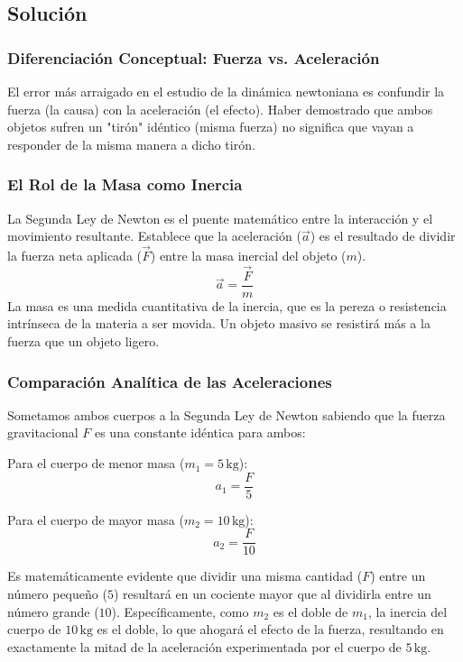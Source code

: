 \documentclass[12pt]{article}
\begin{document}
\subsection*{Solución}

\subsubsection*{Diferenciación Conceptual: Fuerza vs. Aceleración}
El error más arraigado en el estudio de la dinámica newtoniana es confundir la fuerza (la causa) con la aceleración (el efecto). Haber demostrado que ambos objetos sufren un "tirón" idéntico (misma fuerza) no significa que vayan a responder de la misma manera a dicho tirón. 

\subsubsection*{El Rol de la Masa como Inercia}
La Segunda Ley de Newton es el puente matemático entre la interacción y el movimiento resultante. Establece que la aceleración ($\vec{a}$) es el resultado de dividir la fuerza neta aplicada ($\vec{F}$) entre la masa inercial del objeto ($m$).
\begin{equation}
    \vec{a} = \frac{\vec{F}}{m}
\end{equation}
La masa es una medida cuantitativa de la inercia, que es la pereza o resistencia intrínseca de la materia a ser movida. Un objeto masivo se resistirá más a la fuerza que un objeto ligero.

\subsubsection*{Comparación Analítica de las Aceleraciones}
Sometamos ambos cuerpos a la Segunda Ley de Newton sabiendo que la fuerza gravitacional $F$ es una constante idéntica para ambos:

Para el cuerpo de menor masa ($m_1 = 5 \, \text{kg}$):
\begin{equation}
    a_1 = \frac{F}{5}
\end{equation}

Para el cuerpo de mayor masa ($m_2 = 10 \, \text{kg}$):
\begin{equation}
    a_2 = \frac{F}{10}
\end{equation}

Es matemáticamente evidente que dividir una misma cantidad ($F$) entre un número pequeño ($5$) resultará en un cociente mayor que al dividirla entre un número grande ($10$). Específicamente, como $m_2$ es el doble de $m_1$, la inercia del cuerpo de $10 \, \text{kg}$ es el doble, lo que ahogará el efecto de la fuerza, resultando en exactamente la mitad de la aceleración experimentada por el cuerpo de $5 \, \text{kg}$.
\end{document}

